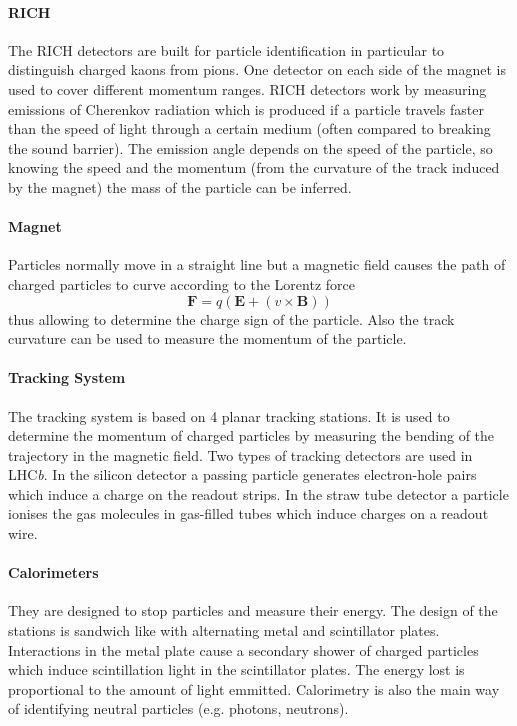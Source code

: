 \documentclass[11pt]{scrreprt}
\begin{document}
\paragraph{RICH} The RICH detectors are built for particle identification in particular to distinguish charged kaons from pions. 
One detector on each side of the magnet is used to cover different momentum ranges. RICH detectors work by measuring emissions of 
Cherenkov radiation which is produced if a particle travels faster than the speed of light through a certain medium (often compared 
to breaking the sound barrier). The emission angle depends on the speed of the particle, so knowing the speed and the momentum (from the
curvature of the track induced by the magnet) the mass of the particle can be inferred.

\paragraph{Magnet} Particles normally move in a straight line but a magnetic field causes the path of charged particles to 
curve according to the Lorentz force 
\[
  \mathbf{F} = q\left( \mathbf{E} + \left( v\times\mathbf{B}\right)\right)
\]
thus allowing to determine the charge sign of the particle. Also the track curvature can be used to measure the momentum of the particle.

\paragraph{Tracking System} The tracking system is based on 4 planar tracking stations. It is used to determine the momentum of charged
particles by measuring the bending of the trajectory in the magnetic field. Two types of tracking detectors are used in LHC\textit{b}. In the silicon detector a passing particle generates electron-hole pairs which induce a charge on the readout strips. In the straw tube detector a particle ionises the gas molecules in gas-filled tubes which induce charges on a readout wire.

\paragraph{Calorimeters} They are designed to stop particles and measure their energy. The design of the stations is sandwich like with alternating metal and scintillator plates. Interactions in the metal plate cause a secondary shower of charged particles which induce scintillation light in the scintillator plates. The energy lost is proportional to the amount of light emmitted. Calorimetry is also the main way of identifying neutral particles (e.g. photons, neutrons).
\end{document}
